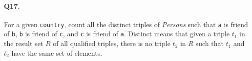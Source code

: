 \paragraph{Q17.}
For a given \texttt{country}, count all the distinct triples of
\emph{Persons} such that \texttt{a} is friend of \texttt{b}, \texttt{b}
is friend of \texttt{c}, and \texttt{c} is friend of \texttt{a}.
Distinct means that given a triple \(t_1\) in the result set \(R\) of
all qualified triples, there is no triple \(t_2\) in \(R\) such that
\(t_1\) and \(t_2\) have the same set of elements.
